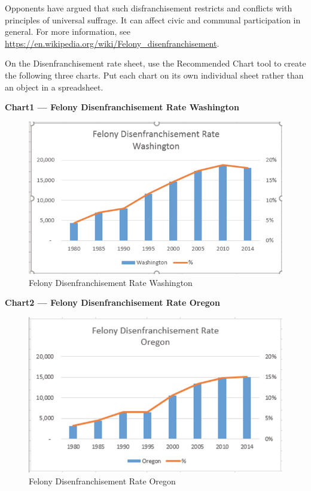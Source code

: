 Opponents have argued that such disfranchisement restricts and conflicts with principles of universal suffrage. It can affect civic and communal participation in general. For more information, see \url{https://en.wikipedia.org/wiki/Felony_disenfranchisement}.

On the Disenfranchisement rate sheet, use the Recommended Chart tool to create the following three charts. Put each chart on its own individual sheet rather than an object in a spreadsheet.

\textbf{Chart1 — Felony Disenfranchisement Rate Washington}

\begin{figure}[H]
	\centering
	\includegraphics[width=\maxwidth{.95\linewidth}]{gfx/ch04_fig54}
	\caption{Felony Disenfranchisement Rate Washington}
	\label{04:fig54}
\end{figure}

\textbf{Chart2 — Felony Disenfranchisement Rate Oregon}

\begin{figure}[H]
	\centering
	\includegraphics[width=\maxwidth{.95\linewidth}]{gfx/ch04_fig55}
	\caption{Felony Disenfranchisement Rate Oregon}
	\label{04:fig55}
\end{figure}

